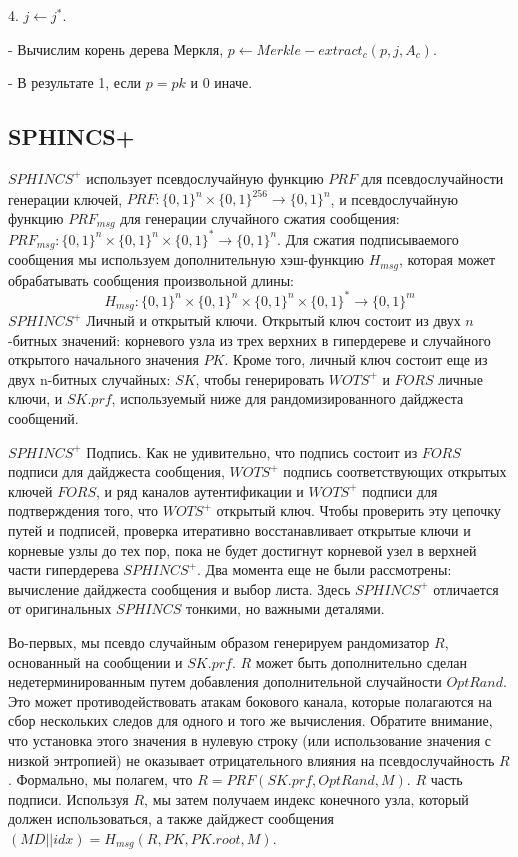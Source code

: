 \documentclass[a4paper, 14pt]{extarticle}
\begin{document}
4. $j \leftarrow j^{*}$.

- Вычислим корень дерева Меркля, $p \leftarrow Merkle-extract_{c}(p, j, A_{c})$.

- В результате 1, если $p = pk$ и 0 иначе.
\subsection{SPHINCS+}
$SPHINCS^{+}$ использует псевдослучайную функцию $PRF$ для псевдослучайности генерации ключей, $PRF : \{0, 1\}^{n} \times \{0, 1\}^{256} \rightarrow \{0, 1\}^{n}$, и псевдослучайную функцию $PRF_{msg}$ для генерации случайного сжатия сообщения: $PRF_{msg} : \{0, 1\}^{n} \times \{0, 1\}^{n} \times \{0, 1\}^{*} \rightarrow \{0, 1\}^{n}$. Для сжатия подписываемого сообщения мы используем дополнительную хэш-функцию $H_{msg}$, которая может обрабатывать сообщения произвольной длины:
\[H_{msg} : \{0, 1\}^{n} \times \{0, 1\}^{n} \times \{0, 1\}^{n} \times \{0, 1\}^{*} \rightarrow \{0, 1\}^{m}\]
$SPHINCS^{+}$ Личный и открытый ключи. Открытый ключ состоит из двух $n$-битных значений: корневого узла из трех верхних в гипердереве и случайного открытого начального значения $PK$. Кроме того, личный ключ состоит еще из двух n-битных случайных: $SK$, чтобы генерировать $WOTS^{+}$ и $FORS$ личные ключи, и $SK.prf$, используемый ниже для рандомизированного дайджеста сообщений.

$SPHINCS^{+}$ Подпись. Как не удивительно, что подпись состоит из $FORS$ подписи для дайджеста сообщения, $WOTS^{+}$ подпись соответствующих открытых ключей $FORS$, и ряд каналов аутентификации и $WOTS^{+}$ подписи для подтверждения того, что $WOTS^{+}$ открытый ключ. Чтобы проверить эту цепочку путей и подписей, проверка итеративно восстанавливает открытые ключи и корневые узлы до тех пор, пока не будет достигнут корневой узел в верхней части гипердерева $SPHINCS^{+}$. Два момента еще не были рассмотрены: вычисление дайджеста сообщения и выбор листа. Здесь $SPHINCS^{+}$ отличается от оригинальных $SPHINCS$ тонкими, но важными деталями.

Во-первых, мы псевдо случайным образом генерируем рандомизатор $R$, основанный на сообщении и $SK.prf$. $R$ может быть дополнительно сделан недетерминированным путем добавления дополнительной случайности $OptRand$. Это может противодействовать атакам бокового канала, которые полагаются на сбор нескольких следов для одного и того же вычисления. Обратите внимание, что установка этого значения в нулевую строку (или использование значения с низкой энтропией) не оказывает отрицательного влияния на псевдослучайность $R$. Формально, мы полагем, что $R = PRF(SK.prf, OptRand, M)$. $R$ часть подписи. Используя $R$, мы затем получаем индекс конечного узла, который должен использоваться, а также дайджест сообщения $(MD||idx) = H_{msg}(R, PK, PK.root, M)$.
\end{document}
